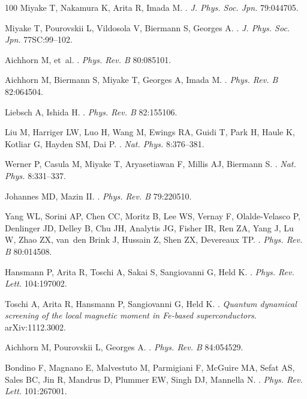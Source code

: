 \documentclass[]{ar2e-changed}%
\begin{document}
\begin{thebibliography}{100}
Miyake T, Nakamura K, Arita R, Imada M.
.
\newblock \emph{J. Phys. Soc. Jpn.} 79:044705.

Miyake T, Pourovskii L, Vildosola V, Biermann S, Georges A.
.
\newblock \emph{J. Phys. Soc. Jpn.} 77SC:99--102.

Aichhorn M, et~al.
.
\newblock \emph{Phys. Rev. B} 80:085101.

Aichhorn M, Biermann S, Miyake T, Georges A, Imada M.
.
\newblock \emph{Phys. Rev. B} 82:064504.

Liebsch A, Ishida H.
.
\newblock \emph{Phys. Rev. B} 82:155106.

Liu M, Harriger LW, Luo H, Wang M, Ewings RA, Guidi T, Park H, Haule K, Kotliar
  G, Hayden SM, Dai P.
.
\newblock \emph{Nat. Phys.} 8:376--381.

Werner P, Casula M, Miyake T, Aryasetiawan F, Millis AJ, Biermann S.
.
\newblock \emph{Nat. Phys.} 8:331--337.

Johannes MD, Mazin II.
.
\newblock \emph{Phys. Rev. B} 79:220510.

Yang WL, Sorini AP, Chen CC, Moritz B, Lee WS, Vernay F, Olalde-Velasco P,
  Denlinger JD, Delley B, Chu JH, Analytis JG, Fisher IR, Ren ZA, Yang J, Lu W,
  Zhao ZX, van~den Brink J, Hussain Z, Shen ZX, Devereaux TP.
.
\newblock \emph{Phys. Rev. B} 80:014508.

Hansmann P, Arita R, Toschi A, Sakai S, Sangiovanni G, Held K.
.
\newblock \emph{Phys. Rev. Lett.} 104:197002.

{Toschi} A, {Arita} R, {Hansmann} P, {Sangiovanni} G, {Held} K.
.
\newblock \emph{{Quantum dynamical screening of the local magnetic moment in
  Fe-based superconductors}}.
\newblock arXiv:1112.3002.

Aichhorn M, Pourovskii L, Georges A.
.
\newblock \emph{Phys. Rev. B} 84:054529.

Bondino F, Magnano E, Malvestuto M, Parmigiani F, McGuire MA, Sefat AS, Sales
  BC, Jin R, Mandrus D, Plummer EW, Singh DJ, Mannella N.
.
\newblock \emph{Phys. Rev. Lett.} 101:267001.


\end{thebibliography}
\end{document}
